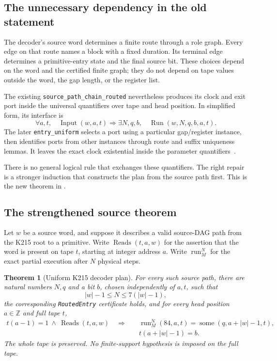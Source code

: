 \documentclass[11pt,letterpaper]{article}
\newtheorem{theorem}{Theorem}[section]
\newcommand{\code}[1]{\texttt{\small #1}}
\begin{document}
\subsection{The unnecessary dependency in the old statement}

The decoder's source word determines a finite route through a role graph. Every edge
on that route names a block with a fixed duration. Its terminal edge determines a
primitive-entry state and the final source bit. These choices depend on the word and
the certified finite graph; they do not depend on tape values outside the word,
the gap length, or the register list.

The existing \code{source\_path\_chain\_routed} nevertheless produces its clock and exit
port inside the universal quantifiers over tape and head position. In simplified form,
its interface is
\[
  \forall a,t,\quad \operatorname{Input}(w,a,t)
       \Longrightarrow \exists N,q,b,\quad \operatorname{Run}(w,N,q,b,a,t).
\]
The later \code{entry\_uniform} selects a port using a particular gap/register instance,
then identifies ports from other instances through route and suffix uniqueness lemmas.
It leaves the exact clock existential inside the parameter quantifiers~\cite{decoder}.

There is no general logical rule that exchanges these quantifiers. The right repair
is a stronger induction that constructs the plan from the source path first.
This is the new theorem in .

\subsection{The strengthened source theorem}

Let \(w\) be a source word, and suppose it describes a valid source-DAG path from the
K215 root to a primitive. Write \(\operatorname{Reads}(t,a,w)\) for the assertion that
the word is present on tape \(t\), starting at integer address \(a\). Write
\(\operatorname{run}_M^N\) for the exact partial execution after \(N\) physical steps.

\begin{theorem}[Uniform K215 decoder plan]
For every such source path, there are natural numbers \(N,q\) and a bit \(b\), chosen
independently of \(a,t\), such that
\[
 |w|-1\le N\le 7(|w|-1),
\]
the corresponding \code{RoutedEntry} certificate holds, and for every head position
\(a\in\mathbb Z\) and full tape \(t\),
\begin{align*}
 t(a-1)=1\ \land\ \operatorname{Reads}(t,a,w)
 \quad\Longrightarrow\quad&
 \operatorname{run}_M^N(84,a,t)
   =\operatorname{some}(q,a+|w|-1,t),\\[-0.3em]
 &t(a+|w|-1)=b.
\end{align*}
The whole tape is preserved. No finite-support hypothesis is imposed on the full tape.
\end{theorem}
\end{document}
